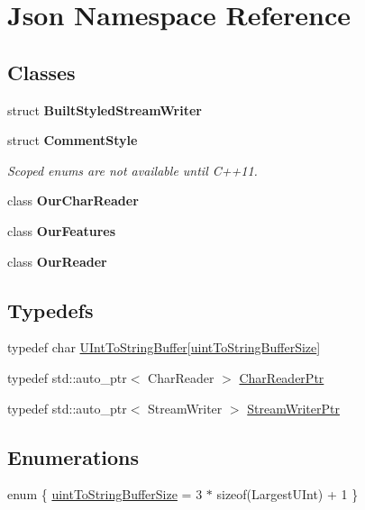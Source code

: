 \hypertarget{namespace_json}{}\section{Json Namespace Reference}
\label{namespace_json}
\subsection*{Classes}
\begin{DoxyCompactItemize}
\item 
struct {\bfseries Built\+Styled\+Stream\+Writer}
\item 
struct {\bfseries Comment\+Style}
\begin{DoxyCompactList}\small\item\em Scoped enums are not available until C++11. \end{DoxyCompactList}\item 
class {\bfseries Our\+Char\+Reader}
\item 
class {\bfseries Our\+Features}
\item 
class {\bfseries Our\+Reader}
\end{DoxyCompactItemize}
\subsection*{Typedefs}
\begin{DoxyCompactItemize}
\item 
typedef char \hyperlink{namespace_json_a602bcf69c2042fb61c3b243cb16f04ca}{U\+Int\+To\+String\+Buffer}\mbox{[}\hyperlink{namespace_json_a0c5f614b019f20b4598dcaec09d9e820ae4f2008c7919f20d81286121d1374424}{uint\+To\+String\+Buffer\+Size}\mbox{]}
\item 
typedef std\+::auto\+\_\+ptr$<$ Char\+Reader $>$ \hyperlink{namespace_json_a4724efb8d41614b47036cb8b54233837}{Char\+Reader\+Ptr}
\item 
typedef std\+::auto\+\_\+ptr$<$ Stream\+Writer $>$ \hyperlink{namespace_json_a7132404aeebfc96d7c6ad2c66260afb5}{Stream\+Writer\+Ptr}
\end{DoxyCompactItemize}
\subsection*{Enumerations}
\begin{DoxyCompactItemize}
\item 
enum \{ \hyperlink{namespace_json_a0c5f614b019f20b4598dcaec09d9e820ae4f2008c7919f20d81286121d1374424}{uint\+To\+String\+Buffer\+Size} = 3 $\ast$ sizeof(Largest\+U\+Int) + 1
 \}
\end{DoxyCompactItemize}
